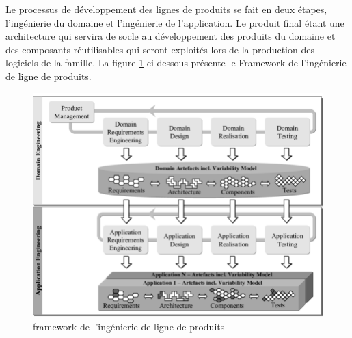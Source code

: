 Le processus de développement des lignes de produits se fait en deux étapes, l'ingénierie du domaine et l'ingénierie de l'application. Le produit final étant une architecture qui servira de socle au développement des produits du domaine et des composants réutilisables qui seront exploités lors de la production des logiciels de la famille. La figure \ref{fig:framework_ILP} ci-dessous présente le Framework de l'ingénierie de ligne de produits.

\begin{figure}[h!]
  \includegraphics[scale=0.9999, width=150mm]{images/SPLE_Framework.png}
  \caption{framework de l'ingénierie de ligne de produits}
  \label{fig:framework_ILP}
\end{figure}


